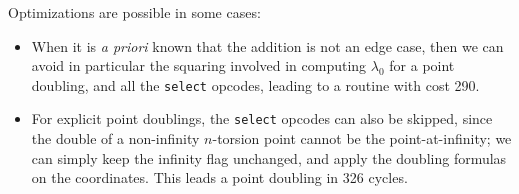 \documentclass{llncs}
\begin{document}
Optimizations are possible in some cases:
\begin{itemize}

    \item When it is \emph{a priori} known that the addition is not an
    edge case, then we can avoid in particular the squaring involved in
    computing $\lambda_0$ for a point doubling, and all the \verb+select+
    opcodes, leading to a routine with cost 290.

    \item For explicit point doublings, the \verb+select+ opcodes can also
    be skipped, since the double of a non-infinity $n$-torsion point cannot
    be the point-at-infinity; we can simply keep the infinity flag
    unchanged, and apply the doubling formulas on the coordinates. This
    leads a point doubling in 326 cycles.

\end{itemize}
\end{document}
